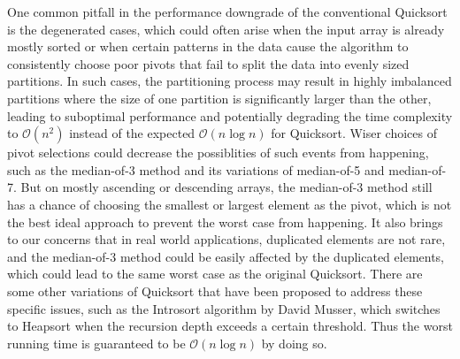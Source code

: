 \documentclass{article}
\newcommand{\bigO}{\mathcal{O}}
\begin{document}
One common pitfall in the performance downgrade of the conventional Quicksort is the degenerated cases,
which could often arise when the input array is already mostly sorted or when certain patterns in the data cause the algorithm to consistently choose poor pivots
that fail to split the data into evenly sized partitions. 
In such cases, the partitioning process may result in highly imbalanced partitions where the size of one partition is significantly larger than the other, leading to suboptimal performance and
potentially degrading the time complexity to $\bigO(n^2)$ instead of the expected $\bigO(n\log n)$ for Quicksort.
Wiser choices of pivot selections could decrease the possiblities of such events from happening, such as the median-of-3 method and its variations of median-of-5 and median-of-7.
But on mostly ascending or descending arrays, the median-of-3 method still has a chance of choosing the smallest or largest element as the pivot,
which is not the best ideal approach to prevent the worst case from happening. It also brings to our concerns that in real world applications, duplicated elements are not rare,
and the median-of-3 method could be easily affected by the duplicated elements, which could lead to the same worst case as the original Quicksort. 
There are some other variations of Quicksort that have been proposed to address these specific issues, such as the Introsort algorithm \cite{Introsort} by David Musser,
which switches to Heapsort when the recursion depth exceeds a certain threshold. Thus the worst running time is guaranteed to be $\bigO(n\log n)$ by doing so.
\end{document}
